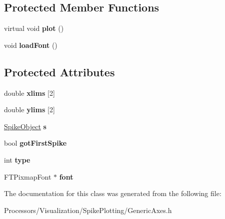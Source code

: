 \subsection*{Protected Member Functions}
\begin{DoxyCompactItemize}
\item 
\hypertarget{classGenericAxes_ab8efb505a6c8286afb705337cec42861}{virtual void {\bfseries plot} ()}\label{classGenericAxes_ab8efb505a6c8286afb705337cec42861}

\item 
\hypertarget{classGenericAxes_a6d73141222a531855a768646f05e79e6}{void {\bfseries load\-Font} ()}\label{classGenericAxes_a6d73141222a531855a768646f05e79e6}

\end{DoxyCompactItemize}
\subsection*{Protected Attributes}
\begin{DoxyCompactItemize}
\item 
\hypertarget{classGenericAxes_a0dc6ef82871c7cc4e9c314b554906e8d}{double {\bfseries xlims} \mbox{[}2\mbox{]}}\label{classGenericAxes_a0dc6ef82871c7cc4e9c314b554906e8d}

\item 
\hypertarget{classGenericAxes_a36cc6558d5be963c0ca0808692e297fe}{double {\bfseries ylims} \mbox{[}2\mbox{]}}\label{classGenericAxes_a36cc6558d5be963c0ca0808692e297fe}

\item 
\hypertarget{classGenericAxes_a693c35b3105a60b704e3cac87b376188}{\hyperlink{structSpikeObject}{Spike\-Object} {\bfseries s}}\label{classGenericAxes_a693c35b3105a60b704e3cac87b376188}

\item 
\hypertarget{classGenericAxes_aa9da8940de6ecf1e6f7816b3186d9470}{bool {\bfseries got\-First\-Spike}}\label{classGenericAxes_aa9da8940de6ecf1e6f7816b3186d9470}

\item 
\hypertarget{classGenericAxes_a0550968e57ded25fa92c7e4108efe904}{int {\bfseries type}}\label{classGenericAxes_a0550968e57ded25fa92c7e4108efe904}

\item 
\hypertarget{classGenericAxes_a511911db715747218e92832b482a76a8}{F\-T\-Pixmap\-Font $\ast$ {\bfseries font}}\label{classGenericAxes_a511911db715747218e92832b482a76a8}

\end{DoxyCompactItemize}


The documentation for this class was generated from the following file\-:\begin{DoxyCompactItemize}
\item 
Processors/\-Visualization/\-Spike\-Plotting/Generic\-Axes.\-h\end{DoxyCompactItemize}
